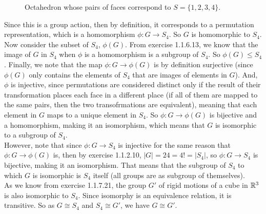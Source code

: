 \documentclass{article}
\begin{document}
\begin{figure}[H]

        \caption{\label{fig:figure1} Octahedron whose pairs of faces
        correspond to $S = \{ 1, 2, 3, 4 \}$.}
    \end{figure}
    
    Since this is a group action, then by definition,
    it corresponds to a permutation representation,
    which is a homomorphism $\phi: G \to S_4$.
    So $G$ is homomorphic to $S_4$. \\
    Now consider the subset of $S_4$, $\phi(G)$.
    From exercise 1.1.6.13, we know that the image of $G$ in $S_4$
    when $\phi$ is a homomorphism is a subgroup of $S_4$.
    So $\phi(G) \leqslant S_4$.
    Finally, we note that the map $\phi: G \to \phi(G)$
    is by definition surjective
    (since $\phi(G)$ only contains the elements of $S_4$ that are images
    of elements in $G$).
    And, $\phi$ is injective, since permutations are considered 
    distinct only if the result of their transformation places each
    face in a different place (if all of them are mapped to the same
    pairs, then the two transofrmations are equivalent),
    meaning that each element in $G$ maps to a unique element in $S_4$.
    So $\phi: G \to \phi(G)$ is bijective and a homomorphism,
    making it an isomorphism,
    which means that $G$ is isomorphic to a subgroup of $S_4$. \\
    However, note that since $\phi: G \to S_4$ is injective for the same
    reason that $\phi: G \to \phi(G)$ is,
    then by exercise 1.1.2.10, $|G| = 24 = 4! = |S_4|$,
    so $\phi: G \to S_4$ is bijective, making it an isomorphism.
    That means that the subgroup of $S_4$ to which $G$ is isomorphic
    is $S_4$ itself (all groups are as subgroup of themselves). \\
    As we know from exercise 1.1.7.21,
    the group $G'$ of rigid motions of a cube in $\mathbb{R}^3$
    is also isomorphic to $S_4$.
    Since isomorphy is an equivalence relation, it is transitive.
    So as $G \cong S_4$ and $S_4 \cong G'$, we have $G \cong G'$.
\end{document}
